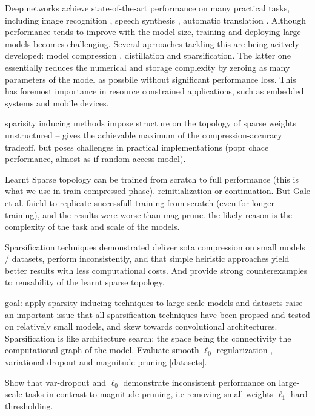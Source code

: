 Deep networks achieve state-of-the-art performance on many practical tasks, including
image recognition \citep{citation_needed}, speech synthesis \citep{citation_needed},
automatic translation \citep{citation_needed}. Although performance tends to improve
with the model size, training and deploying large models becomes challenging. Several
aprroaches tackling this are being acitvely developed: model compression \citep{pruning},
distillation \citep{distill} and sparsification. The latter one essentially reduces
the numerical and storage complexity by zeroing as many parameters of the model as
possbile without significant performance loss. This has foremost importance in resource
constrained applications, such as embedded systems and mobile devices.

sparisity inducing methods impose structure on the topology of sparse weights
unstructured -- gives the achievable maximum of the compression-accuracy tradeoff, but
poses challenges in practical implementations (popr chace performance, almost as if
random access model).

Learnt Sparse topology can be trained from scratch to full performance (this is what
we use in train-compressed phase). reinitialization or continuation. But Gale et al.
faield to replicate successfull training from scratch (even for longer training), and
the results were worse than mag-prune. the likely reason is the complexity of the task
and scale of the models.

Sparsification techniques demonstrated deliver sota compression on small models / datasets,
perform inconsistently, and that simple heiristic approaches yield better results with less
computational costs. And provide strong counterexamples to reusability of the learnt sparse
topology.

goal: apply sparsity inducing techniques to large-scale models and datasets
\citet{galehooker} raise an important issue that all sparsification techniques have been
propsed and tested on relatively small models, and skew towards convolutional architectures.
Sparsification is like architecture search: the space being the connectivity the computational
graph of the model. Evaluate smooth $\ell_0$ regularization \citep{louizos}, variational
dropout \citep{kingma2015} and magnitude pruning \citep{zhu-gupta2017} \ref{datasets}.

Show that var-dropout and $\ell_0$ demonstrate inconsistent performance on large-scale tasks
in contrast to magnitude pruning, i.e removing small weights $\ell_1$ hard thresholding.

